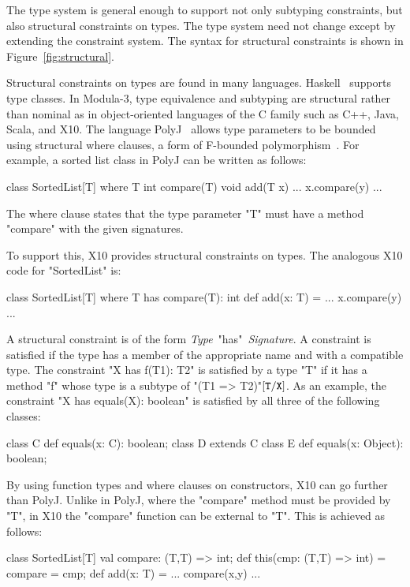 \documentclass[nocopyrightspace,9pt]{sigplanconf}
\begin{document}
The type system is general enough to support not only subtyping
constraints, but also structural constraints on types.  The type
system need not change except by extending the constraint
system.  The syntax for structural constraints is shown in
Figure~\ref{fig:structural}.

Structural constraints on types are found in many languages.
Haskell~\cite{haskell} supports type classes.
In Modula-3, type equivalence and subtyping are structural
rather than nominal as in object-oriented languages of the C
family such as C++, Java, Scala, and X10.
%
The language PolyJ~\cite{polyj} allows type parameters to be bounded using
structural where clauses, a form of F-bounded
polymorphism~\cite{fbounds}.
For example, a sorted list class in PolyJ can be written as follows:
\begin{xten}
class SortedList[T] where T { int compare(T) } {
    void add(T x) { ... x.compare(y) ... }
}
\end{xten}
The where clause states that the type parameter \xcd"T" must have a
method \xcd"compare" with the given signatures.

To support this, X10 provides structural constraints on types.
The analogous X10 code for \xcd"SortedList" is:
\begin{xten}
class SortedList[T] where T has compare(T): int {
    def add(x: T) = { ... x.compare(y) ... }
}
\end{xten}

A structural constraint is of the form \emph{Type}~\xcd"has"~\emph{Signature}.
A constraint is satisfied if the type has a member of the appropriate name
and with a compatible type.  
The constraint \xcd"X has f(T1): T2"
is satisfied by a type \xcd"T" if it has a method \xcd"f"
whose type is a subtype of \xcd"(T1 => T2)"$[{\tt T}/{\tt X}]$.
As an example,
the constraint \xcd"X has equals(X): boolean"
is satisfied by all three of the following classes:
\begin{xten}
class C { def equals(x: C): boolean; }
class D extends C { }
class E { def equals(x: Object): boolean; }
\end{xten}

By using function types and where clauses on constructors,
X10 can go further than PolyJ.
Unlike in PolyJ, where the \xcd"compare" method must be provided by \xcd"T",
in X10 the \xcd"compare" function can be external to \xcd"T".
This is achieved as follows:
\begin{xten}
class SortedList[T] {
    val compare: (T,T) => int;
    def this(cmp: (T,T) => int) = { compare = cmp; }
    def add(x: T) = { ... compare(x,y) ... }
}
\end{xten}
\end{document}
